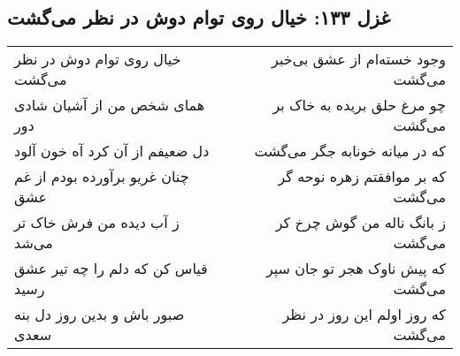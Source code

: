 \begin{center}
\section*{غزل ۱۳۳: خیال روی توام دوش در نظر می‌گشت}
\label{sec:133}
\begin{longtable}{l p{0.5cm} r}
خیال روی توام دوش در نظر می‌گشت
&&
وجود خسته‌ام از عشق بی‌خبر می‌گشت
\\
همای شخص من از آشیان شادی دور
&&
چو مرغ حلق بریده به خاک بر می‌گشت
\\
دل ضعیفم از آن کرد آه خون آلود
&&
که در میانه خونابه جگر می‌گشت
\\
چنان غریو برآورده بودم از غم عشق
&&
که بر موافقتم زهره نوحه گر می‌گشت
\\
ز آب دیده من فرش خاک تر می‌شد
&&
ز بانگ ناله من گوش چرخ کر می‌گشت
\\
قیاس کن که دلم را چه تیر عشق رسید
&&
که پیش ناوک هجر تو جان سپر می‌گشت
\\
صبور باش و بدین روز دل بنه سعدی
&&
که روز اولم این روز در نظر می‌گشت
\\
\end{longtable}
\end{center}
